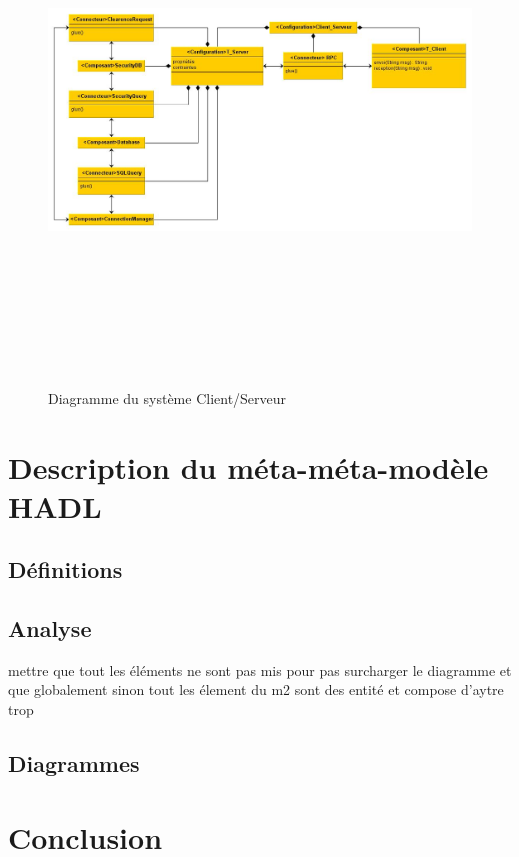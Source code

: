 \documentclass[11pt,a4paper]{article}
\begin{document}
\begin{figure}[h]
  		\centering
  		\includegraphics[height=14cm,width=15cm,angle=90]{M1.jpg}
  		\caption{Diagramme du système Client/Serveur}
  		\label{Diagramme du système Client/Serveur}
\end{figure}

\clearpage
\section{Description du méta-méta-modèle HADL}
\subsection{Définitions}
\subsection{Analyse}

mettre que tout les éléments ne sont pas mis pour pas surcharger le diagramme et que globalement sinon tout les élement du m2 sont des entité et compose d'aytre trop

\subsection{Diagrammes}

\section{Conclusion}
\end{document}

